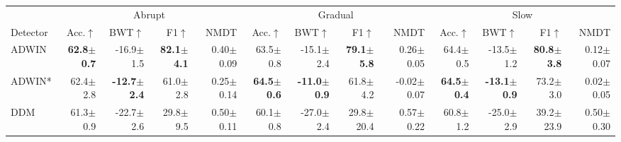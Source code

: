 \begin{tabular}{lr@{\hspace{\dimexpr2\tabcolsep+4pt\relax}}r@{\hspace{\dimexpr2\tabcolsep+4pt\relax}}rrr@{\hspace{\dimexpr2\tabcolsep+4pt\relax}}r@{\hspace{\dimexpr2\tabcolsep+4pt\relax}}rrr@{\hspace{\dimexpr2\tabcolsep+4pt\relax}}r@{\hspace{\dimexpr2\tabcolsep+4pt\relax}}rr}
\toprule
 & \multicolumn{4}{c}{Abrupt} & \multicolumn{4}{c}{Gradual} & \multicolumn{4}{c}{Slow} \\
\cmidrule(lr){2-5}\cmidrule(lr){6-9}\cmidrule(lr){10-13}
Detector & Acc.$\uparrow$ & BWT$\uparrow$ & F1$\uparrow$ & NMDT & Acc.$\uparrow$ & BWT$\uparrow$ & F1$\uparrow$ & NMDT & Acc.$\uparrow$ & BWT$\uparrow$ & F1$\uparrow$ & NMDT \\
\midrule
ADWIN & \textbf{62.8{\tiny\phantom{0}$\pm$0.7}}\rlap{$^{\downarrow}$} & -16.9{\tiny\phantom{0}$\pm$1.5}\rlap{$^{\downarrow}$} & \textbf{82.1{\tiny\phantom{0}$\pm$4.1}} & 0.40{\tiny\phantom{0}$\pm$0.09} & 63.5{\tiny\phantom{0}$\pm$0.8}\rlap{$^{\downarrow}$} & -15.1{\tiny\phantom{0}$\pm$2.4}\rlap{$^{\downarrow}$} & \textbf{79.1{\tiny\phantom{0}$\pm$5.8}} & 0.26{\tiny\phantom{0}$\pm$0.05} & 64.4{\tiny\phantom{0}$\pm$0.5}\rlap{$^{\downarrow}$} & -13.5{\tiny\phantom{0}$\pm$1.2}\rlap{$^{\downarrow}$} & \textbf{80.8{\tiny\phantom{0}$\pm$3.8}} & 0.12{\tiny\phantom{0}$\pm$0.07} \\
ADWIN* & 62.4{\tiny\phantom{0}$\pm$2.8}\rlap{$^{\downarrow\dagger}$} & \textbf{-12.7{\tiny\phantom{0}$\pm$2.4}}\rlap{$^{\downarrow}$} & 61.0{\tiny\phantom{0}$\pm$2.8} & 0.25{\tiny\phantom{0}$\pm$0.14} & \textbf{64.5{\tiny\phantom{0}$\pm$0.6}}\rlap{$^{\downarrow}$} & \textbf{-11.0{\tiny\phantom{0}$\pm$0.9}}\rlap{$^{\downarrow}$} & 61.8{\tiny\phantom{0}$\pm$4.2} & -0.02{\tiny\phantom{0}$\pm$0.07} & \textbf{64.5{\tiny\phantom{0}$\pm$0.4}}\rlap{$^{\downarrow}$} & \textbf{-13.1{\tiny\phantom{0}$\pm$0.9}}\rlap{$^{\downarrow}$} & 73.2{\tiny\phantom{0}$\pm$3.0} & 0.02{\tiny\phantom{0}$\pm$0.05} \\
DDM & 61.3{\tiny\phantom{0}$\pm$0.9}\rlap{$^{\downarrow\dagger}$} & -22.7{\tiny\phantom{0}$\pm$2.6}\rlap{$^{\downarrow}$} & 29.8{\tiny\phantom{0}$\pm$9.5} & 0.50{\tiny\phantom{0}$\pm$0.11} & 60.1{\tiny\phantom{0}$\pm$0.8}\rlap{$^{\downarrow\dagger}$} & -27.0{\tiny\phantom{0}$\pm$2.4}\rlap{$^{\downarrow}$} & 29.8{\tiny$\pm$20.4} & 0.57{\tiny\phantom{0}$\pm$0.22} & 60.8{\tiny\phantom{0}$\pm$1.2}\rlap{$^{\downarrow\dagger}$} & -25.0{\tiny\phantom{0}$\pm$2.9}\rlap{$^{\downarrow}$} & 39.2{\tiny$\pm$23.9} & 0.50{\tiny\phantom{0}$\pm$0.30} \\

\end{tabular}
